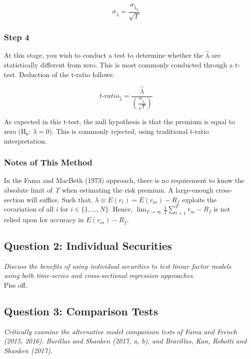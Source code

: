 \documentclass[11pt, english]{article}
\begin{document}
		$$\sigma_{\hat{\lambda}}=\frac{\sigma_{\hat{\lambda}_t}}{\sqrt{T}}$$

		\subsubsection*{Step 4}

	At this stage, you wish to conduct a test to determine whether the $\hat{\lambda}$ are statistically different from zero. This is most commonly conducted through a t-test. Deduction of the t-ratio follows:

		$$\textit{t-ratio}_{\hat{\lambda}}=\frac{\hat{\lambda}}{\left(\frac{\sigma_{\hat{\lambda}_t}}{\sqrt{T}}\right)}$$

	As expected in this t-test, the null hypothesis is that the premium is equal to zero (H$_0$: $\lambda=0$). This is commonly rejected, using traditional t-ratio interpretation.

		\subsubsection*{Notes of This Method}

	In the Fama and MacBeth (1973) approach, there is no requirement to know the absolute limit of \textit{T} when estimating the risk premium. A large-enough cross-section will suffice. Such that, $\lambda\equiv E(r_t)=E(r_m)-R_f$ exploits the covariation of all \textit{i} for $i\in\{1,...,N\}$. Hence, $\lim_{T\rightarrow\infty}\frac{1}{T}\sum_{t=1}^Tr_m-R_f$ is not relied upon for accuracy in $E(r_m)-R_f$.

	\newpage

	\subsection{Question 2: Individual Securities}

	\textit{Discuss the benefits of using individual securities to test linear factor models using both time-series and cross-sectional regression approaches.}\\

	Piss off.

	\newpage

	\subsection{Question 3: Comparison Tests}
             
	\textit{Critically examine the alternative model comparison tests of Fama and French (2015, 2016). Barillas and Shanken (2017, a, b), and Brarillas, Kan, Robotti and Shanken (2017).}
\end{document}
